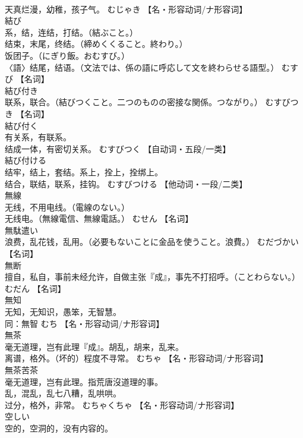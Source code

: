 \documentclass[8pt]{extreport}
\begin{document}
\begin{CJK}{UTF8}{min}
\\	天真烂漫，幼稚，孩子气。	むじゃき		【名・形容动词/ナ形容词】
\\	結び	
\\	系，结，连结，打结。（結ぶこと。） 
\\	结束，末尾，终结。（締めくくること。終わり。） 
\\	饭团子。（にぎり飯。おむすび。） 
\\	〈語〉结尾，结语。（文法では、係の語に呼応して文を終わらせる語型。）	むすび		【名词】
\\	結び付き	
\\	联系，联合。（結びつくこと。二つのものの密接な関係。つながり。）	むすびつき		【名词】
\\	結び付く	
\\	有关系，有联系。 
\\	结成一体，有密切关系。	むすびつく		【自动词・五段/一类】
\\	結び付ける	
\\	结牢，结上，套结。系上，拴上，拴绑上。 
\\	结合，联结，联系，挂钩。	むすびつける		【他动词・一段/二类】
\\	無線	
\\	无线，不用电线。（電線のない。） 
\\	无线电。（無線電信、無線電話。）	むせん		【名词】
\\	無駄遣い	
\\	浪费，乱花钱，乱用。（必要もないことに金品を使うこと。浪費。）	むだづかい		【名词】
\\	無断	
\\	擅自，私自，事前未经允许，自做主张『成』，事先不打招呼。（ことわらない。）	むだん		【名词】
\\	無知	
\\	无知，无知识，愚笨，无智慧。 
\\	同：無智	むち		【名・形容动词/ナ形容词】
\\	無茶	
\\	毫无道理，岂有此理『成』。胡乱，胡来，乱来。 
\\	离谱，格外。（坏的）程度不寻常。	むちゃ		【名・形容动词/ナ形容词】
\\	無茶苦茶	
\\	毫无道理，岂有此理。指荒唐沒道理的事。 
\\	乱，混乱，乱七八糟，乱哄哄。 
\\	过分，格外，非常。	むちゃくちゃ		【名・形容动词/ナ形容词】
\\	空しい	
\\	空的，空洞的，没有内容的。 

\end{CJK}
\end{document}
